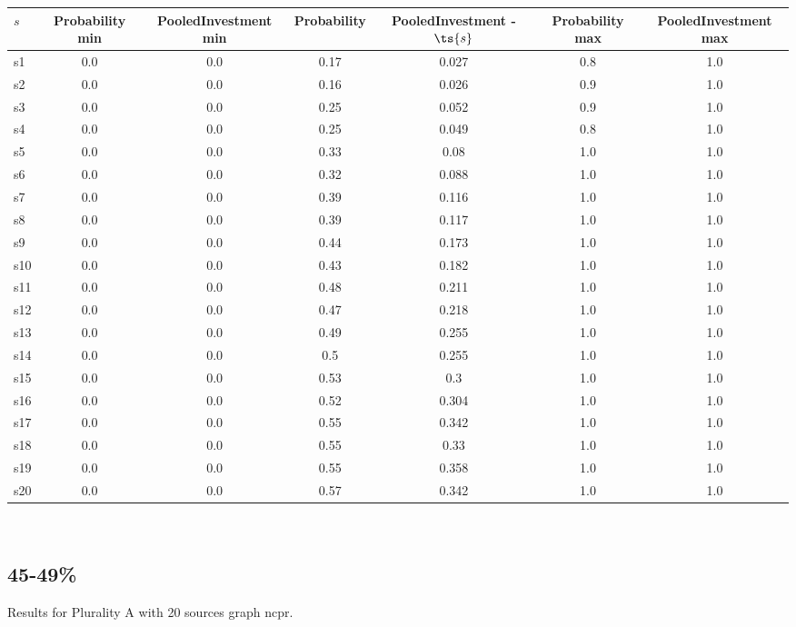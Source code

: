 \documentclass{article}
\begin{document}
\noindent\begin{tabular}{|l|c|c|c|c|c|c|}
\hline
$s$& Probability min & PooledInvestment min & Probability & PooledInvestment - $\ts{s}$ & Probability max & PooledInvestment max\\
\hline
s1 &0.0 & 0.0 & 0.17 & 0.027 & 0.8 & 1.0\\
\hline
s2 &0.0 & 0.0 & 0.16 & 0.026 & 0.9 & 1.0\\
\hline
s3 &0.0 & 0.0 & 0.25 & 0.052 & 0.9 & 1.0\\
\hline
s4 &0.0 & 0.0 & 0.25 & 0.049 & 0.8 & 1.0\\
\hline
s5 &0.0 & 0.0 & 0.33 & 0.08 & 1.0 & 1.0\\
\hline
s6 &0.0 & 0.0 & 0.32 & 0.088 & 1.0 & 1.0\\
\hline
s7 &0.0 & 0.0 & 0.39 & 0.116 & 1.0 & 1.0\\
\hline
s8 &0.0 & 0.0 & 0.39 & 0.117 & 1.0 & 1.0\\
\hline
s9 &0.0 & 0.0 & 0.44 & 0.173 & 1.0 & 1.0\\
\hline
s10 &0.0 & 0.0 & 0.43 & 0.182 & 1.0 & 1.0\\
\hline
s11 &0.0 & 0.0 & 0.48 & 0.211 & 1.0 & 1.0\\
\hline
s12 &0.0 & 0.0 & 0.47 & 0.218 & 1.0 & 1.0\\
\hline
s13 &0.0 & 0.0 & 0.49 & 0.255 & 1.0 & 1.0\\
\hline
s14 &0.0 & 0.0 & 0.5 & 0.255 & 1.0 & 1.0\\
\hline
s15 &0.0 & 0.0 & 0.53 & 0.3 & 1.0 & 1.0\\
\hline
s16 &0.0 & 0.0 & 0.52 & 0.304 & 1.0 & 1.0\\
\hline
s17 &0.0 & 0.0 & 0.55 & 0.342 & 1.0 & 1.0\\
\hline
s18 &0.0 & 0.0 & 0.55 & 0.33 & 1.0 & 1.0\\
\hline
s19 &0.0 & 0.0 & 0.55 & 0.358 & 1.0 & 1.0\\
\hline
s20 &0.0 & 0.0 & 0.57 & 0.342 & 1.0 & 1.0\\
\hline
\end{tabular}\\

\newpage

\subsection{45-49\%}

\noindent Results for Plurality A with 20 sources graph ncpr.
\end{document}
